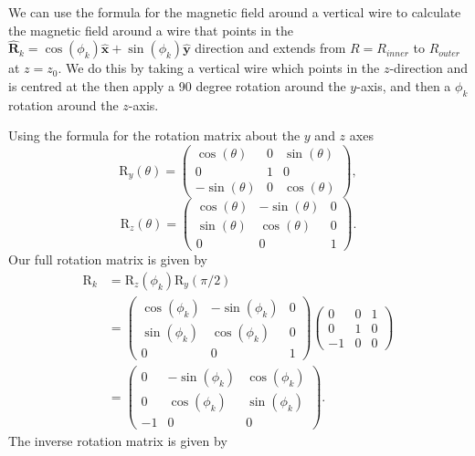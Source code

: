\documentclass{article}
\begin{document}
We can use the formula for the magnetic field around a vertical wire to calculate the
 magnetic field around a wire that points
in the $\mathbf{\hat{R}}_k = \cos(\phi_k)\mathbf{\hat{x}}+\sin(\phi_k)\mathbf{\hat{y}}$ direction
 and extends from $R=R_{inner}$ to $R_{outer}$ at $z=z_0$.
 We do this by taking a vertical wire which points in the $z$-direction
 and is centred at the then apply a 90 degree rotation around the $y$-axis,
  and then a $\phi_k$ rotation around the $z$-axis.

Using the formula for the rotation matrix about the $y$ and $z$ axes
\[\text{R}_y(\theta) = \begin{pmatrix}
    \cos(\theta) & 0 & \sin(\theta) \\
    0 & 1 & 0 \\
    -\sin(\theta) & 0 & \cos(\theta)
\end{pmatrix},\]
\[\text{R}_z(\theta) = \begin{pmatrix}
    \cos(\theta) & -\sin(\theta) & 0 \\
    \sin(\theta) & \cos(\theta) & 0 \\
    0 & 0 & 1
\end{pmatrix}.\]
Our full rotation matrix is given by
\[\begin{aligned}
    \text{R}_k&=\text{R}_z(\phi_k)\text{R}_y(\pi/2) \\
    &=\begin{pmatrix}
        \cos(\phi_k) & -\sin(\phi_k) & 0 \\
        \sin(\phi_k) & \cos(\phi_k) & 0 \\
        0 & 0 & 1
    \end{pmatrix}
    \begin{pmatrix}
        0 & 0 & 1 \\
        0 & 1 & 0 \\
        -1 & 0 & 0
    \end{pmatrix} \\
    &= \begin{pmatrix}
        0 & -\sin(\phi_k) & \cos(\phi_k) \\
        0 & \cos(\phi_k) & \sin(\phi_k) \\
        -1 & 0 & 0
    \end{pmatrix}.
\end{aligned} \]
The inverse rotation matrix is given by
\end{document}
